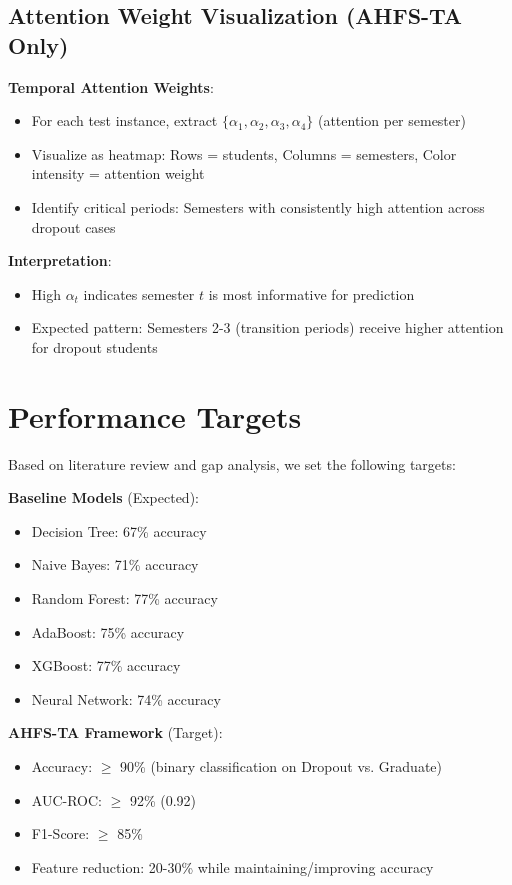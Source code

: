 \subsection{Attention Weight Visualization (AHFS-TA Only)}

\textbf{Temporal Attention Weights}:
\begin{itemize}
\item For each test instance, extract $\{\alpha_1, \alpha_2, \alpha_3, \alpha_4\}$ (attention per semester)
\item Visualize as heatmap: Rows = students, Columns = semesters, Color intensity = attention weight
\item Identify critical periods: Semesters with consistently high attention across dropout cases
\end{itemize}

\textbf{Interpretation}:
\begin{itemize}
\item High $\alpha_t$ indicates semester $t$ is most informative for prediction
\item Expected pattern: Semesters 2-3 (transition periods) receive higher attention for dropout students
\end{itemize}

\section{Performance Targets}

Based on literature review and gap analysis, we set the following targets:

\textbf{Baseline Models} (Expected):
\begin{itemize}
\item Decision Tree: 67\% accuracy
\item Naive Bayes: 71\% accuracy
\item Random Forest: 77\% accuracy
\item AdaBoost: 75\% accuracy
\item XGBoost: 77\% accuracy
\item Neural Network: 74\% accuracy
\end{itemize}

\textbf{AHFS-TA Framework} (Target):
\begin{itemize}
\item Accuracy: $\geq$ 90\% (binary classification on Dropout vs. Graduate)
\item AUC-ROC: $\geq$ 92\% (0.92)
\item F1-Score: $\geq$ 85\%
\item Feature reduction: 20-30\% while maintaining/improving accuracy
\end{itemize}

